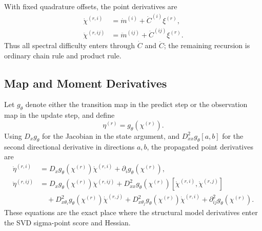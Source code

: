 With fixed quadrature offsets, the point derivatives are
\begin{align}
\label{eq:bf-svd-sp-point-first}
  \dot\chi^{(r,i)} &= \dot m^{(i)}+\dot C^{(i)}\xi^{(r)},\\
\label{eq:bf-svd-sp-point-second}
  \ddot\chi^{(r,ij)} &= \ddot m^{(ij)}+\ddot C^{(ij)}\xi^{(r)}.
\end{align}
Thus all spectral difficulty enters through $\dot C$ and $\ddot C$; the
remaining recursion is ordinary chain rule and product rule.

\subsection{Map and Moment Derivatives}
\label{sec:bf-svd-sp-map-moment-derivatives}

Let $g_\theta$ denote either the transition map in the predict step or the
observation map in the update step, and define
\[
  \eta^{(r)} = g_\theta(\chi^{(r)}).
\]
Using $D_xg_\theta$ for the Jacobian in the state argument, and
$D^2_{xx}g_\theta[a,b]$ for the second directional derivative in directions
$a,b$, the propagated point derivatives are
\begin{align}
\label{eq:bf-svd-sp-map-first}
  \dot\eta^{(r,i)}
  &=
  D_xg_\theta(\chi^{(r)})\dot\chi^{(r,i)}
  +\partial_i g_\theta(\chi^{(r)}),\\
\label{eq:bf-svd-sp-map-second}
  \ddot\eta^{(r,ij)}
  &=
  D_xg_\theta(\chi^{(r)})\ddot\chi^{(r,ij)}
  +D^2_{xx}g_\theta(\chi^{(r)})
      [\dot\chi^{(r,i)},\dot\chi^{(r,j)}] \nonumber\\
  &\quad
  +D^2_{x\theta_i}g_\theta(\chi^{(r)})\dot\chi^{(r,j)}
  +D^2_{x\theta_j}g_\theta(\chi^{(r)})\dot\chi^{(r,i)}
  +\partial^2_{ij}g_\theta(\chi^{(r)}).
\end{align}
These equations are the exact place where the structural model derivatives
enter the SVD sigma-point score and Hessian.

